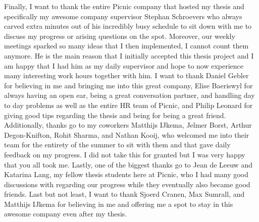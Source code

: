 Finally, I want to thank the entire Picnic company that hosted my thesis and specifically my awesome
company supervisor Stephan Schroevers who always carved extra minutes out of his incredibly busy schedule
to sit down with me to discuss my progress or arising questions on the spot. Moreover, our weekly meetings
sparked so many ideas that I then implemented, I cannot count them anymore. He is the main reason that
I initially accepted this thesis project and I am happy that I had him as my daily supervisor and hope
to now experience many interesting work hours together with him.
I want to thank Daniel Gebler for believing in me and bringing me into this great company,
Elise Baeriswyl for always having an open ear, being a great conversation partner,
and handling day to day problems as well as the entire HR team of Picnic,
and Philip Leonard for giving good tips regarding the thesis and being for being a great friend.
Additionally, thanks go to my coworkers Matthijs IJkema, Jelmer Borst, Arthur Degon-Knifton, Rohit Sharma,
and Nathan Kooij, who welcomed me into their team for the entirety of the summer to sit with them
and that gave daily feedback on my progress.
I did not take this for granted but I was very happy that you all took me.
Lastly, one of the biggest thanks go to Jean de Leeuw and Katarina Lang, my fellow thesis students here
at Picnic, who I had many good discussions with regarding our progress while they eventually also became
good friends.
Last but not least, I want to thank Sjoerd Cranen, Max Sumrall, and Matthijs IJkema for believing in
me and offering me a spot to stay in this awesome company even after my thesis.

\vfill

\cleardoublepage

\raggedbottom
